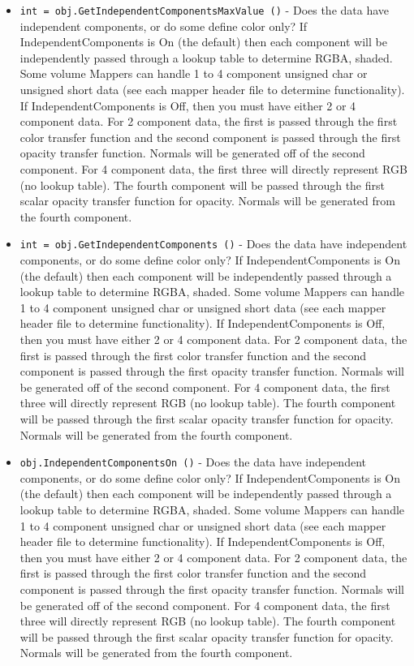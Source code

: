 \begin{itemize}
\item  \verb|int = obj.GetIndependentComponentsMaxValue ()| -  Does the data have independent components, or do some define color 
 only? If IndependentComponents is On (the default) then each component 
 will be independently passed through a lookup table to determine RGBA, 
 shaded. Some volume Mappers can handle 1 to 4 component 
 unsigned char or unsigned short data (see each mapper header file to
 determine functionality). If IndependentComponents is Off, then you 
 must have either 2 or 4 component data. For 2 component data, the 
 first is passed through the first color transfer function and the 
 second component is passed through the first opacity transfer function. 
 Normals will be generated off of the second component. For 4 component 
 data, the first three will directly represent RGB (no lookup table). 
 The fourth component will be passed through the first scalar opacity 
 transfer function for opacity. Normals will be generated from the fourth 
 component.

\item  \verb|int = obj.GetIndependentComponents ()| -  Does the data have independent components, or do some define color 
 only? If IndependentComponents is On (the default) then each component 
 will be independently passed through a lookup table to determine RGBA, 
 shaded. Some volume Mappers can handle 1 to 4 component 
 unsigned char or unsigned short data (see each mapper header file to
 determine functionality). If IndependentComponents is Off, then you 
 must have either 2 or 4 component data. For 2 component data, the 
 first is passed through the first color transfer function and the 
 second component is passed through the first opacity transfer function. 
 Normals will be generated off of the second component. For 4 component 
 data, the first three will directly represent RGB (no lookup table). 
 The fourth component will be passed through the first scalar opacity 
 transfer function for opacity. Normals will be generated from the fourth 
 component.

\item  \verb|obj.IndependentComponentsOn ()| -  Does the data have independent components, or do some define color 
 only? If IndependentComponents is On (the default) then each component 
 will be independently passed through a lookup table to determine RGBA, 
 shaded. Some volume Mappers can handle 1 to 4 component 
 unsigned char or unsigned short data (see each mapper header file to
 determine functionality). If IndependentComponents is Off, then you 
 must have either 2 or 4 component data. For 2 component data, the 
 first is passed through the first color transfer function and the 
 second component is passed through the first opacity transfer function. 
 Normals will be generated off of the second component. For 4 component 
 data, the first three will directly represent RGB (no lookup table). 
 The fourth component will be passed through the first scalar opacity 
 transfer function for opacity. Normals will be generated from the fourth 
 component.


\end{itemize}
